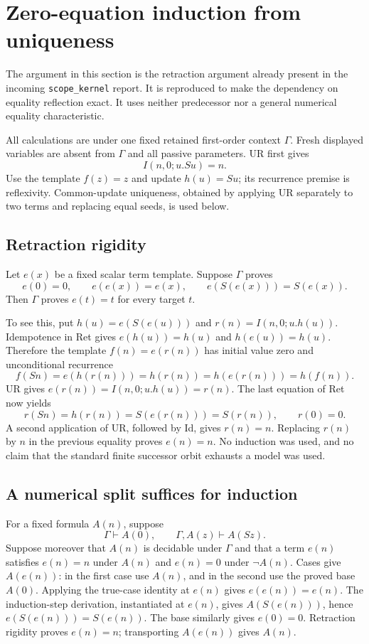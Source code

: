 \section{Zero-equation induction from uniqueness}
\label{sec:ur-retraction-complete}

The argument in this section is the retraction argument already present in
the incoming \texttt{scope\_kernel} report.  It is reproduced to make the
dependency on equality reflection exact.  It uses neither predecessor nor
a general numerical equality characteristic.

All calculations are under one fixed retained first-order context
$\Gamma$.  Fresh displayed variables are absent from $\Gamma$ and all
passive parameters.  UR first gives
\[
                         I(n,0;u.Su)=n.                  \tag{Id}
\]
Use the template $f(z)=z$ and update $h(u)=Su$; its recurrence premise is
reflexivity.  Common-update uniqueness, obtained by applying UR separately
to two terms and replacing equal seeds, is used below.

\subsection{Retraction rigidity}
Let $e(x)$ be a fixed scalar term template.  Suppose $\Gamma$ proves
\[
 e(0)=0,\qquad e(e(x))=e(x),\qquad e(S(e(x)))=S(e(x)).    \tag{Ret}
\]
Then $\Gamma$ proves $e(t)=t$ for every target $t$.

To see this, put $h(u)=e(S(e(u)))$ and $r(n)=I(n,0;u.h(u))$.
Idempotence in Ret gives $e(h(u))=h(u)$ and $h(e(u))=h(u)$.
Therefore the template $f(n)=e(r(n))$ has initial value zero and
unconditional recurrence
\[
 f(Sn)=e(h(r(n)))=h(r(n))=h(e(r(n)))=h(f(n)).
\]
UR gives $e(r(n))=I(n,0;u.h(u))=r(n)$.
The last equation of Ret now yields
\[
 r(Sn)=h(r(n))=S(e(r(n)))=S(r(n)),\qquad r(0)=0.
\]
A second application of UR, followed by Id, gives $r(n)=n$.
Replacing $r(n)$ by $n$ in the previous equality proves $e(n)=n$.
No induction was used, and no claim that the standard finite successor
orbit exhausts a model was used.

\subsection{A numerical split suffices for induction}
For a fixed formula $A(n)$, suppose
\[
 \Gamma\vdash A(0),\qquad \Gamma,A(z)\vdash A(Sz).
\]
Suppose moreover that $A(n)$ is decidable under $\Gamma$ and that a term
$e(n)$ satisfies $e(n)=n$ under $A(n)$ and $e(n)=0$ under $\neg A(n)$.
Cases give $A(e(n))$: in the first case use $A(n)$, and in the second
use the proved base $A(0)$.  Applying the true-case identity at $e(n)$
gives $e(e(n))=e(n)$.  The induction-step derivation, instantiated at
$e(n)$, gives $A(S(e(n)))$, hence $e(S(e(n)))=S(e(n))$.
The base similarly gives $e(0)=0$.  Retraction rigidity proves $e(n)=n$;
transporting $A(e(n))$ gives $A(n)$.

